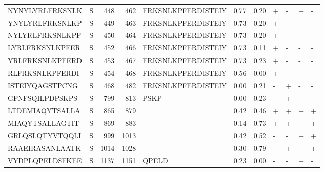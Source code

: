 \begin{tabular}{llrrlrrllll}
NYNYLYRLFRKSNLK &       S &    448 &   462 &  FRKSNLKPFERDISTEIY &            0.77 &             0.20 &      + &       - &      + &       - \\
YNYLYRLFRKSNLKP &       S &    449 &   463 &  FRKSNLKPFERDISTEIY &            0.73 &             0.20 &      + &       - &      - &       - \\
NYLYRLFRKSNLKPF &       S &    450 &   464 &  FRKSNLKPFERDISTEIY &            0.73 &             0.20 &      + &       - &      - &       - \\
LYRLFRKSNLKPFER &       S &    452 &   466 &  FRKSNLKPFERDISTEIY &            0.73 &             0.11 &      + &       - &      - &       - \\
YRLFRKSNLKPFERD &       S &    453 &   467 &  FRKSNLKPFERDISTEIY &            0.73 &             0.23 &      + &       - &      - &       - \\
RLFRKSNLKPFERDI &       S &    454 &   468 &  FRKSNLKPFERDISTEIY &            0.56 &             0.00 &      + &       - &      - &       - \\
ISTEIYQAGSTPCNG &       S &    468 &   482 &  FRKSNLKPFERDISTEIY &            0.00 &             0.21 &      - &       + &      - &       - \\
GFNFSQILPDPSKPS &       S &    799 &   813 &                PSKP &            0.00 &             0.23 &      - &       + &      - &       - \\
LTDEMIAQYTSALLA &       S &    865 &   879 &                     &            0.42 &             0.46 &      + &       + &      + &       + \\
MIAQYTSALLAGTIT &       S &    869 &   883 &                     &            0.14 &             0.73 &      + &       + &      + &       + \\
GRLQSLQTYVTQQLI &       S &    999 &  1013 &                     &            0.42 &             0.52 &      - &       - &      + &       + \\
RAAEIRASANLAATK &       S &   1014 &  1028 &                     &            0.30 &             0.79 &      - &       + &      - &       + \\
VYDPLQPELDSFKEE &       S &   1137 &  1151 &               QPELD &            0.23 &             0.00 &      - &       - &      + &       - \\
\bottomrule
\end{tabular}
